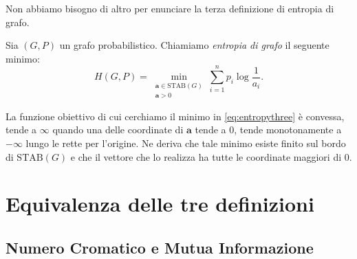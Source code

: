 Non abbiamo bisogno di altro per enunciare la terza definizione di entropia di grafo. 
\begin{definition}
  Sia \((G,P)\) un grafo probabilistico. Chiamiamo \emph{entropia di grafo} il seguente minimo: 
  \begin{equation}
    \label{eq:entropythree} H(G,P)=\min_{\substack{\mathbf{a}\in \text{STAB}(G) \\
	\mathbf{a} > 0}} \sum_{i=1}^n p_i \log{\frac{1}{a_i}}. 
  \end{equation}
\end{definition}
\begin{remark}
  La funzione obiettivo di cui cerchiamo il minimo in \eqref{eq:entropythree} è convessa, tende a \(\infty\) quando una delle coordinate di \(\mathbf{a}\) tende a \(0\), tende monotonamente a \(-\infty\) lungo le rette per l'origine. Ne deriva che tale minimo esiste finito sul bordo di \(\text{STAB}(G)\) e che il vettore che lo realizza ha tutte le coordinate maggiori di \(0\). 
\end{remark}

\section{Equivalenza delle tre definizioni}

\subsection{Numero Cromatico e Mutua Informazione}

